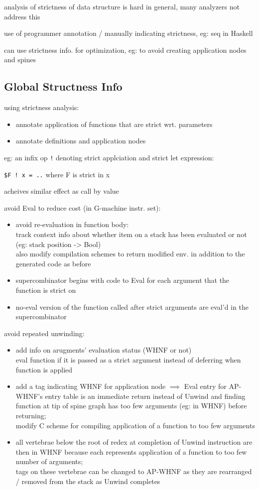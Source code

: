 \documentclass[8pt]{extarticle}
\begin{document}
\begin{multicols*}{2}
analysis of strictness of data structure is hard in general, many analyzers not address this

use of programmer annotation / manually indicating strictness, eg: seq in Haskell

can use strictness info. for optimization, eg: to avoid creating application nodes and spines

\subsection{Global Structness Info}

using strictness analysis:
\begin{itemize}
\item annotate application of functions that are strict wrt. parameters
\item annotate definitions and application nodes
\end{itemize}

eg: an infix op \verb|!| denoting strict applciation and strict let expression:

\verb|$F ! x = ..| where F is strict in x

acheives similar effect as call by value

avoid Eval to reduce cost (in G-machine instr. set):
\begin{itemize}
\item avoid re-evaluation in function body:\\
  track context info about whether item on a stack has been evaluated or not (eg: stack position -> Bool)\\
  also modify compilation schemes to return modified env. in addition to the generated code as before
\item supercombinator begins with code to Eval for each argument that the function is strict on
\item no-eval version of the function called after strict arguments are eval'd in the supercombinator 
\end{itemize}

avoid repeated unwinding:
\begin{itemize}
\item add info on arugments' evaluation status (WHNF or not)\\
  eval function if it is passed as a strict argument instead of deferring when function is applied
\item add a tag indicating WHNF for application node $\implies$ Eval entry for AP-WHNF's entry table is an immediate return instead of Unwind and finding function at tip of spine graph has too few arguments (eg: in WHNF) before returning;\\
  modify C scheme for compiling application of a function to too few arguments
\item all vertebrae below the root of redex at completion of Unwind instruction are then in WHNF because each represents application of a function to too few number of arguments;\\
  tags on these vertebrae can be changed to AP-WHNF as they are rearranged / removed from the stack as Unwind completes
\end{itemize}


\end{multicols*}
\end{document}
